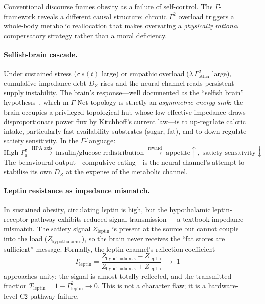 \documentclass[aps,pre,twocolumn,superscriptaddress,floatfix]{revtex4-2}
\begin{document}
Conventional discourse frames obesity as a failure
of self-control.
The $\Gamma$-framework reveals a different causal
structure: chronic $\Gamma^2$ overload triggers a
whole-body metabolic reallocation that makes
overeating a \emph{physically rational} compensatory
strategy rather than a moral deficiency.

\paragraph{Selfish-brain cascade.}
Under sustained stress ($\sigma\,s(t)$ large) or
empathic overload
($\lambda\,\Gamma^2_{\text{other}}$ large),
cumulative impedance debt $D_Z$ rises and the neural
channel reads persistent supply instability.
The brain's response---well documented as the
``selfish brain'' hypothesis~\cite{Peters2011},
which in $\Gamma$-Net topology is strictly an
\emph{asymmetric energy sink}: the brain occupies a
privileged topological hub whose low effective
impedance draws disproportionate power flux by
Kirchhoff's current law---is
to up-regulate caloric intake, particularly
fast-availability substrates (sugar, fat),
and to down-regulate satiety sensitivity.
In the $\Gamma$-language:
%
\begin{equation}
  \text{High }\Gamma_n^2
  \;\xrightarrow{\text{HPA axis}}\;
  \text{insulin/glucose redistribution}
  \;\xrightarrow{\text{reward}}\;
  \text{appetite}\!\uparrow,\;
  \text{satiety sensitivity}\!\downarrow
  \label{eq:selfish-brain}
\end{equation}
%
The behavioural output---compulsive eating---is the
neural channel's attempt to stabilise its own $D_Z$
at the expense of the metabolic channel.

\paragraph{Leptin resistance as impedance mismatch.}
In sustained obesity, circulating leptin is high,
but the hypothalamic leptin-receptor pathway exhibits
reduced signal transmission~\cite{Moran2019}---a
textbook impedance mismatch.
The satiety signal $Z_{\text{leptin}}$ is present
at the source but cannot couple into the load
($Z_{\text{hypothalamus}}$), so the brain never
receives the ``fat stores are sufficient'' message.
Formally, the leptin channel's reflection coefficient
%
\[
  \Gamma_{\text{leptin}}
  = \frac{Z_{\text{hypothalamus}}
          - Z_{\text{leptin}}}
         {Z_{\text{hypothalamus}}
          + Z_{\text{leptin}}}
  \;\to\; 1
\]
%
approaches unity: the signal is almost totally
reflected, and the transmitted fraction
$T_{\text{leptin}} = 1 - \Gamma_{\text{leptin}}^2
\to 0$.
This is not a character flaw;
it is a hardware-level C2-pathway failure.
\end{document}
